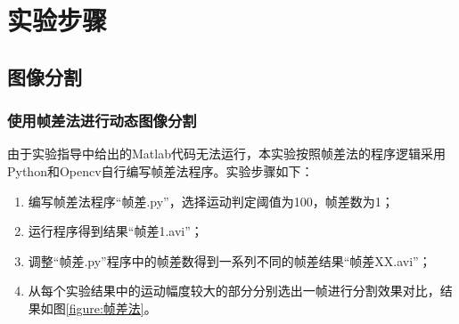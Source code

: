 \documentclass[a4paper]{ctexart}
\begin{document}
\section{实验步骤}
\subsection{图像分割}\label{sec:图像分割}
\subsubsection{使用帧差法进行动态图像分割}
由于实验指导中给出的Matlab代码无法运行，本实验按照帧差法的程序逻辑采用Python和Opencv自行编写帧差法程序。实验步骤如下：
\begin{enumerate}[label=\arabic*、]
	\item 编写帧差法程序“帧差.py”，选择运动判定阈值为100，帧差数为1；
	\item 运行程序得到结果“帧差1.avi”；
	\item 调整“帧差.py”程序中的帧差数得到一系列不同的帧差结果“帧差XX.avi”；
	\item 从每个实验结果中的运动幅度较大的部分分别选出一帧进行分割效果对比，结果如图\ref{figure:帧差法}。
\end{enumerate}
\end{document}
